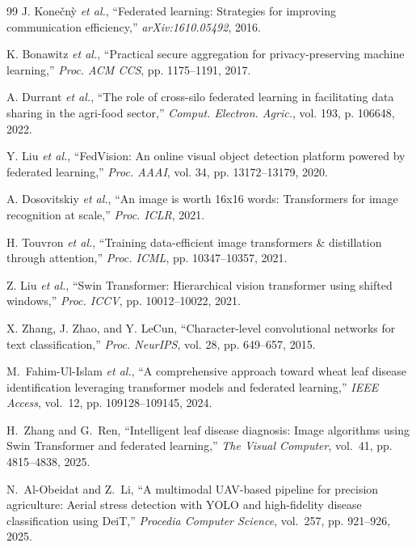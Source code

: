 \documentclass[10pt,journal,compsoc]{IEEEtran}
\begin{document}
\begin{thebibliography}{99}
J. Kone{\v{c}}n{\`y} \textit{et al.}, ``Federated learning: Strategies for improving communication efficiency,'' \textit{arXiv:1610.05492}, 2016.

K. Bonawitz \textit{et al.}, ``Practical secure aggregation for privacy-preserving machine learning,'' \textit{Proc. ACM CCS}, pp. 1175--1191, 2017.

A. Durrant \textit{et al.}, ``The role of cross-silo federated learning in facilitating data sharing in the agri-food sector,'' \textit{Comput. Electron. Agric.}, vol. 193, p. 106648, 2022.

Y. Liu \textit{et al.}, ``FedVision: An online visual object detection platform powered by federated learning,'' \textit{Proc. AAAI}, vol. 34, pp. 13172--13179, 2020.

A. Dosovitskiy \textit{et al.}, ``An image is worth 16x16 words: Transformers for image recognition at scale,'' \textit{Proc. ICLR}, 2021.

H. Touvron \textit{et al.}, ``Training data-efficient image transformers \& distillation through attention,'' \textit{Proc. ICML}, pp. 10347--10357, 2021.

Z. Liu \textit{et al.}, ``Swin Transformer: Hierarchical vision transformer using shifted windows,'' \textit{Proc. ICCV}, pp. 10012--10022, 2021.

X. Zhang, J. Zhao, and Y. LeCun, ``Character-level convolutional networks for text classification,'' \textit{Proc. NeurIPS}, vol. 28, pp. 649--657, 2015.


M.~Fahim-Ul-Islam \textit{et al.}, ``A comprehensive approach toward wheat leaf disease identification leveraging transformer models and federated learning,'' \textit{IEEE Access}, vol.~12, pp. 109128--109145, 2024.

H.~Zhang and G.~Ren, ``Intelligent leaf disease diagnosis: Image algorithms using Swin Transformer and federated learning,'' \textit{The Visual Computer}, vol.~41, pp. 4815--4838, 2025.

N.~Al-Obeidat and Z.~Li, ``A multimodal UAV-based pipeline for precision agriculture: Aerial stress detection with YOLO and high-fidelity disease classification using DeiT,'' \textit{Procedia Computer Science}, vol.~257, pp. 921--926, 2025.


\end{thebibliography}
\end{document}
